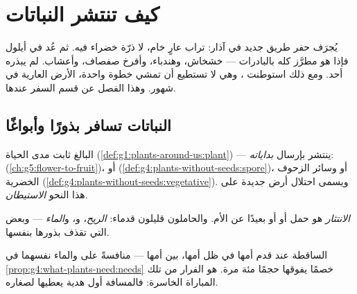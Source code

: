 \chapter{كيف تنتشر النباتات}\label{ch:g6:how-plants-spread}

يُجرَف حفر طريق جديد في آذار: تراب عارٍ خام، لا ذرّة خضراء فيه.
ثم عُد في أيلول فإذا هو مطرَّز كله بالبادرات --- خشخاش، وهندباء،
وأفرخ صفصاف، وأعشاب. لم يبذره أحد. ومع ذلك استوطنت ، وهي
لا تستطيع أن تمشي خطوة واحدة، الأرض العارية في شهور. وهذا الفصل عن
قسم السفر عندها.

\section{النباتات تسافر بذورًا وأبواغًا}

\begin{proposition}\label{prop:g6:how-plants-spread:travel}
 البالغ ثابت مدى الحياة
(\cref{def:g1:plants-around-us:plant}) ---  ينتشر بإرسال
\emph{بداياته}:   (\cref{ch:g5:flower-to-fruit})، أو
 (\cref{def:g4:plants-without-seeds:spore})، أو 
وسائر الزحوف الخضرية
(\cref{def:g4:plants-without-seeds:vegetative}). ويسمى احتلال أرض
جديدة على هذا النحو \emph{الاستيطان}.
\end{proposition}
\admitted

\begin{definition}[الانتثار]\label{def:g6:how-plants-spread:dispersal}
\emph{الانتثار} هو حمل  أو  أو 
بعيدًا عن  الأم. والحاملون قليلون قدماء: \emph{الريح}،
و\emph{}، و\emph{الماء} --- وبعض  التي تقذف بذورها
بنفسها.
\end{definition}

\begin{example}\label{ex:g6:how-plants-spread:whyleave}
 الساقطة عند قدم أمها  في ظل أمها، بين  أمها ---
منافسةً على  والماء نفسهما في
\cref{prop:g4:what-plants-need:needs} خصمًا يفوقها حجمًا مئة مرة.
 هو الفرار من تلك المباراة الخاسرة: فالمسافة أول هدية
يعطيها  لصغاره.
\end{example}

